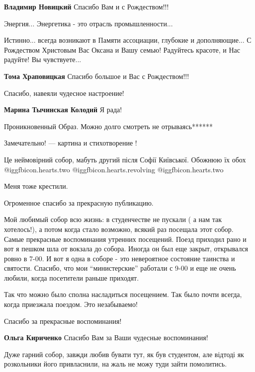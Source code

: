\begin{itemize}
\textbf{Владимир Новицкий} Спасибо Вам и с Рождеством!!!

Энергия... Энергетика - это отрасль промышленности...


Истинно... всегда возникают в Памяти ассоциации, глубокие и дополняющие... С
Рождеством Христовым Вас Оксана и Вашу семью! Радуйтесь красоте, и Нас радуйте!
Вы чувствуете...

\textbf{Тома Храповицкая} Спасибо большое и Вас с Рождеством!!!

Спасибо, навеяли чудесное настроение!

\textbf{Марина Тычинская Колодий} Я рада!

Проникновенный
Образ. Можно долго смотреть не отрываясь******

Замечательно! — картина и стихотворение !

Це неймовірний собор, мабуть другий після Софії Київської. Обожнюю їх обох  @igg{fbicon.hearts.two}  @igg{fbicon.hearts.revolving}  @igg{fbicon.hearts.two} 

Меня тоже крестили.


Огроменное спасибо за прекрасную публикацию.

Мой любимый собор всю жизнь: в студенчестве не пускали ( а нам так хотелось!),
а потом когда стало возможно, всякий раз посещала этот собор. Самые прекрасные
воспоминания утренних посещений. Поезд приходил рано и вот я пешком шла от
вокзала до собора. Иногда он был еще закрыт, открывался ровно в 7-00. И вот я
одна в соборе - это невероятное состояние таинства и святости. Спасибо, что мои
\enquote{министерские} работали с 9-00 и еще не очень любили, когда посетители
раньше приходят.

Так что можно было сполна насладиться посещением. Так было почти всегда, когда
приезжала поездом. Это незабываемо!

Спасибо за прекрасные воспоминания!

\textbf{Ольга Кириченко} Спасибо Вам за Ваши чудесные воспоминания!


Дуже гарний собор, завжди любив бувати тут, як був студентом, але відтоді як
розкольники його привласнили, на жаль не можу туди зайти помолитись.



\end{itemize}
